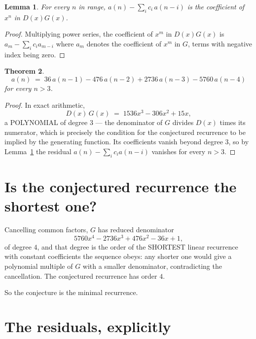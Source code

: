 \documentclass[11pt,a4paper]{article}
\theoremstyle{plain}
\newtheorem{theorem}{Theorem}
\newtheorem{lemma}[theorem]{Lemma}
\theoremstyle{definition}
\begin{document}
\begin{lemma}\label{lem:key}
For every $n$ in range, $a(n)-\sum_i c_i\,a(n-i)$ is the coefficient of $x^{n}$ in
$D(x)G(x)$.
\end{lemma}

\begin{proof}
Multiplying power series, the coefficient of $x^{m}$ in $D(x)G(x)$ is
$a_m-\sum_i c_i a_{m-i}$ where $a_m$ denotes the coefficient of $x^{m}$ in $G$, terms with
negative index being zero.
\end{proof}

\begin{theorem}
\[
a(n)\;=\;36\,a(n-1) - 476\,a(n-2) + 2736\,a(n-3) - 5760\,a(n-4)
\]
for every $n>3$.
\end{theorem}

\begin{proof}
In exact arithmetic,
\[
D(x)\,G(x)\;=\;1536 x^{3} - 306 x^{2} + 15 x,
\]
a POLYNOMIAL of degree $3$ --- the denominator of $G$ divides $D(x)$ times its numerator,
which is precisely the condition for the conjectured recurrence to be implied by the
generating function. Its coefficients vanish beyond degree $3$, so by
Lemma~\ref{lem:key} the residual $a(n)-\sum_ic_ia(n-i)$ vanishes for every
$n>3$.
\end{proof}

\section{Is the conjectured recurrence the shortest one?}

Cancelling common factors, $G$ has reduced denominator
\[
5760 x^{4} - 2736 x^{3} + 476 x^{2} - 36 x + 1,
\]
of degree $4$, and that degree is the order of the SHORTEST linear recurrence with
constant coefficients the sequence obeys: any shorter one would give a polynomial multiple of
$G$ with a smaller denominator, contradicting the cancellation. The conjectured recurrence has
order $4$.

So the conjecture is the minimal recurrence.

\section{The residuals, explicitly}
\end{document}
